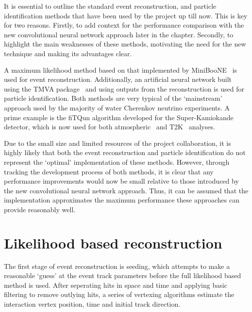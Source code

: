 It is essential to outline the standard event reconstruction, and particle identification methods
that have been used by the \chips project up till now. This is key for two reasons. Firstly, to
add context for the performance comparison with the new convolutional neural network approach
later in the chapter. Secondly, to highlight the main weaknesses of these methods, motivating the
need for the new technique and making its advantages clear.

A maximum likelihood method based on that implemented by MiniBooNE~\cite{patterson2009} is used
for event reconstruction. Additionally, an artificial neural network built using the TMVA
package~\cite{hocker2007} and using outputs from the reconstruction is used for particle
identification. Both methods are very typical of the `mainstream' approach used by the majority of
water Cherenkov neutrino experiments. A prime example is the fiTQun algorithm developed for the
Super-Kamiokande detector, which is now used for both atmospheric~\cite{jiang2019} and
T2K~\cite{missert2017} analyses.

Due to the small size and limited resources of the \chips project collaboration, it is highly
likely that both the event reconstruction and particle identification do not represent the
`optimal' implementation of these methods. However, through tracking the development process of
both methods, it is clear that any performance improvements would now be small relative to those
introduced by the new convolutional neural network approach. Thus, it can be assumed that the
implementation approximates the maximum performance these approaches can provide reasonably well.

\section{Likelihood based reconstruction} %
\label{sec:cvn_old_reco} %

The first stage of event reconstruction is seeding, which attempts to make a reasonable `guess' at
the event track parameters before the full likelihood based method is used. After seperating hits
in space and time and applying basic filtering to remove outlying hits, a series of vertexing
algorithms estimate the interaction vertex position, time and initial track direction.

